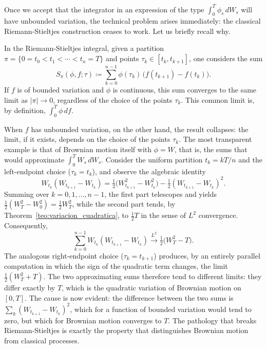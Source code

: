 \documentclass[11pt,a4paper,oneside]{report}
\theoremstyle{plain}
\theoremstyle{definition}
\theoremstyle{remark}
\newcommand{\1}{\mathbf{1}}
\newcommand{\eqdef}{\coloneqq}
\begin{document}
Once we accept
that the integrator in an expression of the type
$\int_0^T \phi_s\, dW_s$ will have unbounded variation, the technical
problem arises immediately: the classical Riemann-Stieltjes
construction ceases to work. Let us briefly recall why.

In the Riemann-Stieltjes integral, given a partition
$\pi = \{0 = t_0 < t_1 < \cdots < t_n = T\}$ and points
$\tau_k \in [t_k, t_{k+1}]$, one considers the sum
\begin{equation*}
  S_\pi(\phi, f; \tau) \eqdef \sum_{k=0}^{n-1} \phi(\tau_k)\,
                              \bigl(f(t_{k+1}) - f(t_k)\bigr).
\end{equation*}
If $f$ is of bounded variation and $\phi$ is continuous, this sum
converges to the same limit as $|\pi| \to 0$, regardless of the
choice of the points $\tau_k$. This common limit is, by definition,
$\int_0^T \phi\, df$.

When $f$ has unbounded variation, on the other hand, the result
collapses: the limit, if it exists, depends on the choice of the
points $\tau_k$. The most transparent example is that of Brownian
motion itself with $\phi = W$, that is, the sums that would
approximate $\int_0^T W_s\, dW_s$. Consider the uniform partition
$t_k = kT/n$ and the left-endpoint choice ($\tau_k = t_k$), and
observe the algebraic identity
\begin{equation*}
  W_{t_k}(W_{t_{k+1}} - W_{t_k})
  = \tfrac{1}{2}\bigl(W_{t_{k+1}}^2 - W_{t_k}^2\bigr)
   - \tfrac{1}{2}(W_{t_{k+1}} - W_{t_k})^2.
\end{equation*}
Summing over $k = 0, 1, \ldots, n-1$, the first part telescopes and
yields $\tfrac{1}{2}(W_T^2 - W_0^2) = \tfrac{1}{2} W_T^2$, while the
second part tends, by Theorem~\ref{teo:variacion_cuadratica}, to
$\tfrac{1}{2} T$ in the sense of $L^2$ convergence. Consequently,
\begin{equation}\label{eq:suma_izq}
  \sum_{k=0}^{n-1} W_{t_k}(W_{t_{k+1}} - W_{t_k})
  \xrightarrow{L^2} \tfrac{1}{2}\bigl(W_T^2 - T\bigr).
\end{equation}
The analogous right-endpoint choice ($\tau_k = t_{k+1}$) produces, by
an entirely parallel computation in which the sign of the quadratic
term changes, the limit $\tfrac{1}{2}(W_T^2 + T)$. The two
approximating sums therefore tend to different limits: they differ
exactly by $T$, which is the quadratic variation of Brownian motion
on $[0, T]$. The cause is now evident: the difference between the two
sums is $\sum_k (W_{t_{k+1}} - W_{t_k})^2$, which for a function of
bounded variation would tend to zero, but which for Brownian motion
converges to $T$. The pathology that breaks Riemann-Stieltjes is
exactly the property that distinguishes Brownian motion from
classical processes.
\end{document}
